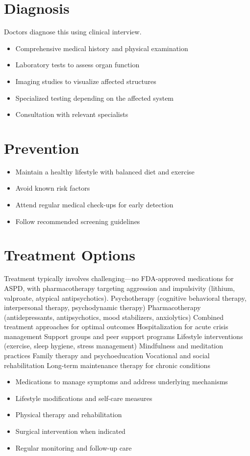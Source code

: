 \section{Diagnosis}
Doctors diagnose this using clinical interview.

\begin{itemize}[noitemsep]
  \item Comprehensive medical history and physical examination
  \item Laboratory tests to assess organ function
  \item Imaging studies to visualize affected structures
  \item Specialized testing depending on the affected system
  \item Consultation with relevant specialists
\end{itemize}
\section{Prevention}
\begin{itemize}[noitemsep]
  \item Maintain a healthy lifestyle with balanced diet and exercise
  \item Avoid known risk factors
  \item Attend regular medical check-ups for early detection
  \item Follow recommended screening guidelines
\end{itemize}
\section{Treatment Options}
Treatment typically involves challenging---no FDA-approved medications for ASPD, with pharmacotherapy targeting aggression and impulsivity (lithium, valproate, atypical antipsychotics). Psychotherapy (cognitive behavioral therapy, interpersonal therapy, psychodynamic therapy) Pharmacotherapy (antidepressants, antipsychotics, mood stabilizers, anxiolytics) Combined treatment approaches for optimal outcomes Hospitalization for acute crisis management Support groups and peer support programs Lifestyle interventions (exercise, sleep hygiene, stress management) Mindfulness and meditation practices Family therapy and psychoeducation Vocational and social rehabilitation Long-term maintenance therapy for chronic conditions

\begin{itemize}[noitemsep]
  \item Medications to manage symptoms and address underlying mechanisms
  \item Lifestyle modifications and self-care measures
  \item Physical therapy and rehabilitation
  \item Surgical intervention when indicated
  \item Regular monitoring and follow-up care
\end{itemize}
